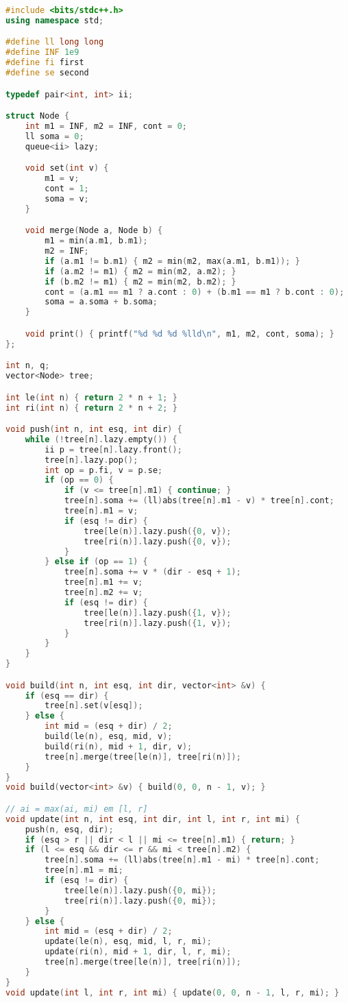 \documentclass[11pt, a4paper, twoside]{book}
\begin{document}
\hfill

\begin{lstlisting}[language=C++]
#include <bits/stdc++.h>
using namespace std;

#define ll long long
#define INF 1e9
#define fi first
#define se second

typedef pair<int, int> ii;

struct Node {
    int m1 = INF, m2 = INF, cont = 0;
    ll soma = 0;
    queue<ii> lazy;

    void set(int v) {
        m1 = v;
        cont = 1;
        soma = v;
    }

    void merge(Node a, Node b) {
        m1 = min(a.m1, b.m1);
        m2 = INF;
        if (a.m1 != b.m1) { m2 = min(m2, max(a.m1, b.m1)); }
        if (a.m2 != m1) { m2 = min(m2, a.m2); }
        if (b.m2 != m1) { m2 = min(m2, b.m2); }
        cont = (a.m1 == m1 ? a.cont : 0) + (b.m1 == m1 ? b.cont : 0);
        soma = a.soma + b.soma;
    }

    void print() { printf("%d %d %d %lld\n", m1, m2, cont, soma); }
};

int n, q;
vector<Node> tree;

int le(int n) { return 2 * n + 1; }
int ri(int n) { return 2 * n + 2; }

void push(int n, int esq, int dir) {
    while (!tree[n].lazy.empty()) {
        ii p = tree[n].lazy.front();
        tree[n].lazy.pop();
        int op = p.fi, v = p.se;
        if (op == 0) {
            if (v <= tree[n].m1) { continue; }
            tree[n].soma += (ll)abs(tree[n].m1 - v) * tree[n].cont;
            tree[n].m1 = v;
            if (esq != dir) {
                tree[le(n)].lazy.push({0, v});
                tree[ri(n)].lazy.push({0, v});
            }
        } else if (op == 1) {
            tree[n].soma += v * (dir - esq + 1);
            tree[n].m1 += v;
            tree[n].m2 += v;
            if (esq != dir) {
                tree[le(n)].lazy.push({1, v});
                tree[ri(n)].lazy.push({1, v});
            }
        }
    }
}

void build(int n, int esq, int dir, vector<int> &v) {
    if (esq == dir) {
        tree[n].set(v[esq]);
    } else {
        int mid = (esq + dir) / 2;
        build(le(n), esq, mid, v);
        build(ri(n), mid + 1, dir, v);
        tree[n].merge(tree[le(n)], tree[ri(n)]);
    }
}
void build(vector<int> &v) { build(0, 0, n - 1, v); }

// ai = max(ai, mi) em [l, r]
void update(int n, int esq, int dir, int l, int r, int mi) {
    push(n, esq, dir);
    if (esq > r || dir < l || mi <= tree[n].m1) { return; }
    if (l <= esq && dir <= r && mi < tree[n].m2) {
        tree[n].soma += (ll)abs(tree[n].m1 - mi) * tree[n].cont;
        tree[n].m1 = mi;
        if (esq != dir) {
            tree[le(n)].lazy.push({0, mi});
            tree[ri(n)].lazy.push({0, mi});
        }
    } else {
        int mid = (esq + dir) / 2;
        update(le(n), esq, mid, l, r, mi);
        update(ri(n), mid + 1, dir, l, r, mi);
        tree[n].merge(tree[le(n)], tree[ri(n)]);
    }
}
void update(int l, int r, int mi) { update(0, 0, n - 1, l, r, mi); }


\end{lstlisting}
\end{document}
